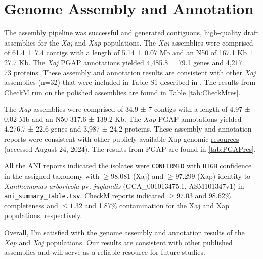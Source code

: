 \documentclass[
]{book}
\begin{document}
\section{Genome Assembly and Annotation}\label{genome-assembly-and-annotation-1}

The assembly pipeline was successful and generated contiguous, high-quality draft assemblies for the \emph{Xaj} and \emph{Xap} populations. The \emph{Xaj} assemblies were comprised of 61.4 ± 7.4 contigs with a length of 5.14 ± 0.07 Mb and an N50 of 167.1 Kb ± 27.7 Kb. The \emph{Xaj} PGAP annotations yielded 4,485.8 ± 79.1 genes and 4,217 ± 73 proteins. These assembly and annotation results are consistent with other \emph{Xaj} assemblies (n=32) that were included in Table S1 described in \citet{assis2021}. The results from CheckM run on the polished assemblies are found in Table \ref{tab:CheckMres}.

The \emph{Xap} assemblies were comprised of 34.9 ± 7 contigs with a length of 4.97 ± 0.02 Mb and an N50 317.6 ± 139.2 Kb. The \emph{Xap} PGAP annotations yielded 4,276.7 ± 22.6 genes and 3,987 ± 24.2 proteins. These assembly and annotation reports were consistent with other publicly available Xap genomic \href{https://www.ncbi.nlm.nih.gov/datasets/genome/?taxon=69929&annotated_only=true&refseq_annotation=true}{resources} (accessed August 24, 2024). The results from PGAP are found in \ref{tab:PGAPres}.

All the ANI reports indicated the isolates were \texttt{CONFIRMED} with \texttt{HIGH} confidence in the assigned taxonomy with \(\geq 98.081%
\) (Xaj) and \(\geq 97.299%
\) (Xap) identity to \emph{Xanthomonas arboricola} pv. \emph{juglandis} (GCA\_001013475.1, ASM101347v1) in \texttt{ani\_summary\_table.tsv}. CheckM reports indicated \(\geq 97.03%
\) and 98.62\% completeness and \(\leq 1.32%
\) and 1.87\% contamination for the Xaj and Xap populations, respectively.

Overall, I'm satisfied with the genome assembly and annotation results of the \emph{Xap} and \emph{Xaj} populations. Our results are consistent with other published assemblies and will serve as a reliable resource for future studies.
\end{document}

